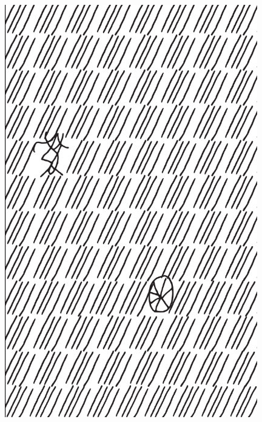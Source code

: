 \makeatletter\@openrightfalse
\movetooddpage
\begin{absolutelynopagebreak}
\begin{vplace}
\begin{figure}[H]
\begin{adjustwidth}{-0.99cm}{}
  \centering
  \vspace*{-1.77cm}
  \hspace*{-0.50cm}
  \includegraphics[width=110mm]{./imgs/img4.pdf}  
  \hfill
\end{adjustwidth}

\thispagestyle{empty}

\end{figure}
\end{vplace}

\end{absolutelynopagebreak}

